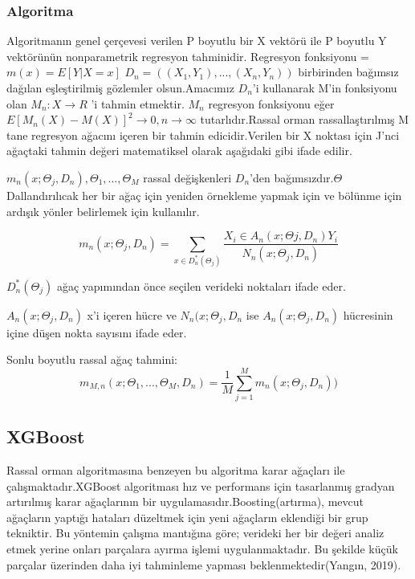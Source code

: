 \documentclass[12pt,twoside]{deuthesis}
\begin{document}
\hypertarget{algoritma}{%
\subsubsection{Algoritma}\label{algoritma}}

Algoritmanın genel çerçevesi verilen P boyutlu bir X vektörü ile P boyutlu Y vektörünün nonparametrik regresyon tahminidir. Regresyon fonksiyonu = \(m(x) = E[Y | X = x]\) \(D_{n} = ((X_{1},Y_{1}),...,(X_{n},Y_{n}))\) birbirinden bağımsız dağılan eşleştirilmiş gözlemler olsun.Amacımız \(D_{n}\)'i kullanarak M'in fonksiyonu olan \(M_{n} : X \to R\) 'i tahmin etmektir. \(M_{n}\) regresyon fonksiyonu eğer \(E[M_{n}(X) - M(X)]^{2} \to 0 , n \to \infty\) tutarlıdır.Rassal orman rassallaştırılmış M tane regresyon ağacını içeren bir tahmin edicidir.Verilen bir X noktası için J'nci ağaçtaki tahmin değeri matematiksel olarak aşağıdaki gibi ifade edilir.

\(m_{n}(x;\Theta_{j},D_{n}) , \Theta_{1},...,\Theta_{M}\) rassal değişkenleri \(D_{n}\)'den bağımsızdır.\(\Theta\) Dallandırılıcak her bir ağaç için yeniden örnekleme yapmak için ve bölünme için ardışık yönler belirlemek için kullanılır.

\[m_{n}(x;\Theta_{j},D_{n}) = \sum_{x \in D_{n}^{*}(\Theta_{j})}^{} \frac{X_{i} \in A_{n}(x;\Theta{j},D_{n})Y_{i}}{N_{n}(x;\Theta_{j},D_{n})}\]

\(D_{n}^{*}(\Theta_{j})\) ağaç yapımından önce seçilen verideki noktaları ifade eder.

\(A_{n}(x;\Theta_{j},D_{n})\) x'i içeren hücre ve \(N_{n}(x;\Theta_{j},D_{n}\) ise \(A_{n}(x;\Theta_{j},D_{n})\) hücresinin içine düşen nokta sayısını ifade eder.

Sonlu boyutlu rassal ağaç tahmini:
\[m_{M,n}(x;\Theta_{1},...,\Theta_{M},D_{n}) = \frac{1}{M} \sum_{j=1}^{M} m_{n}(x;\Theta_{j},D_{n}))\]

\hypertarget{xgboost}{%
\subsection{XGBoost}\label{xgboost}}

Rassal orman algoritmasına benzeyen bu algoritma karar ağaçları ile çalışmaktadır.XGBoost algoritması hız ve performans için tasarlanmış gradyan artırılmış karar ağaçlarının bir uygulamasıdır.Boosting(artırma), mevcut ağaçların yaptığı hataları düzeltmek için yeni ağaçların eklendiği bir grup tekniktir.
Bu yöntemin çalışma mantığına göre; verideki her bir değeri analiz etmek yerine onları parçalara ayırma işlemi uygulanmaktadır. Bu şekilde küçük parçalar üzerinden daha iyi tahminleme yapması beklenmektedir(Yangın, 2019).
\end{document}

